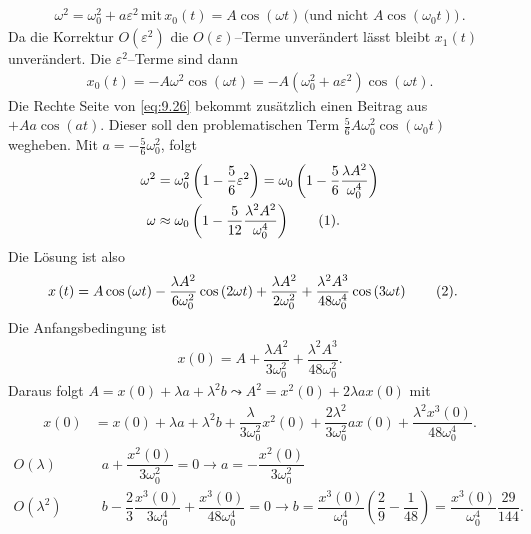\documentclass[a4paper,12pt]{article}
\newcommand\inlineeqnowo{{\theequation}} %
\numberwithin{equation}{section}
\begin{document}
\begin{align*} 
        \omega ^2=\omega _0^2+a\varepsilon ^2\,\text{mit}\,x_0\left(t\right)=A\cos \left(\omega t\right)\,\text{(und nicht $A\cos \left(\omega _0t\right)$)}\,
.\end{align*} 
Da die Korrektur $O\left(\varepsilon ^2\right)$ die $O\left(\varepsilon \right)$--Terme unverändert lässt bleibt $x_1\left(t\right)$ unverändert. Die $\varepsilon ^2$--Terme sind dann
\begin{align*} 
        x_0\left(t\right)=-A\omega ^2\cos \left(\omega t\right)=-A\left(\omega _0^2+a\varepsilon ^2\right)\cos \left(\omega t\right)
.\end{align*} 
Die Rechte Seite von \eqref{eq:9.26} bekommt zusätzlich einen Beitrag aus $+Aa\cos \left(at\right)$. Dieser soll den problematischen Term $\tfrac{5}{6}A\omega _0^2\cos \left(\omega _0t\right)$ wegheben. Mit $a=-\tfrac{5}{6}\omega _0^2$, folgt
\begin{align} 
        \omega ^2&=\omega _0^2\left(1-\dfrac{5}{6}\varepsilon ^2\right)=\omega _0\left(1-\dfrac{5}{6}\dfrac{\lambda A^2}{\omega _0^4}\right)\nonumber \\
        \omega &\approx \omega _0\left(1-\dfrac{5}{12}\dfrac{\lambda ^2A^2}{\omega _0^4}\right)\stepcounter{equation}\tag{\inlineeqnowo}\label{eq:9.29}
.\end{align} 
Die Lösung ist also
\begin{align} 
        x\left(t\right)&=A\cos \left(\omega t\right)-\dfrac{\lambda A^2}{6\omega _0^2}\cos \left(2\omega t\right)+\dfrac{\lambda A^2}{2\omega _0^2}+\dfrac{\lambda ^2A^3}{48\omega _0^4}\cos \left(3\omega t\right)\stepcounter{equation}\tag{\inlineeqnowo}\label{eq:9.30}
.\end{align} 
Die Anfangsbedingung ist
\begin{align*} 
        x\left(0\right)=A+\dfrac{\lambda A^2}{3\omega _0^2}+\dfrac{\lambda ^2A^3}{48\omega _0^2}
.\end{align*} 
Daraus folgt $A=x\left(0\right)+\lambda a+\lambda ^2b\leadsto A^2=x^2\left(0\right)+2\lambda ax\left(0\right)$ mit
\begin{align*} 
        x\left(0\right)&=x\left(0\right)+\lambda a+\lambda ^2b+\dfrac{\lambda }{3\omega _0^2}x^2\left(0\right)+\dfrac{2\lambda ^2}{3\omega _0^2}ax\left(0\right)+\dfrac{\lambda ^2x^3\left(0\right)}{48\omega _0^4}
.\end{align*} 
\begin{align*} 
        O\left(\lambda \right)&\qquad a+\dfrac{x^2\left(0\right)}{3\omega _0^2}=0\rightarrow a=-\dfrac{x^2\left(0\right)}{3\omega _0^2}\\
        O\left(\lambda ^2\right)&\qquad b-\dfrac{2}{3}\dfrac{x^3\left(0\right)}{3\omega _0^4}+\dfrac{x^3\left(0\right)}{48\omega _0^4}=0\rightarrow b=\dfrac{x^3\left(0\right)}{\omega _0^4}\left(\dfrac{2}{9}-\dfrac{1}{48}\right)=\dfrac{x^3\left(0\right)}{\omega _0^4}\dfrac{29}{144}
.\end{align*} 
\end{document}
